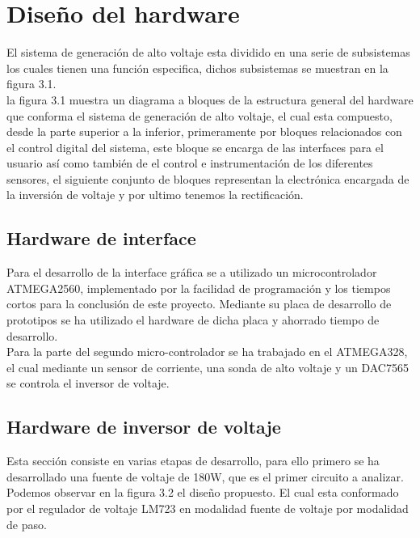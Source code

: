 \section{Diseño del hardware}
El sistema de generación de alto voltaje esta dividido en una serie de subsistemas los cuales tienen una función especifica, dichos subsistemas se muestran en la figura 3.1.\\

la figura 3.1 muestra un diagrama a bloques de la estructura general del hardware que conforma el sistema de generación de alto voltaje, el cual esta compuesto, desde la parte superior a la inferior, primeramente por bloques relacionados con el control digital del sistema, este bloque se encarga de las interfaces para el usuario así como también de el control e instrumentación de los diferentes sensores, el siguiente conjunto de bloques representan la electrónica encargada de la inversión de voltaje y por ultimo tenemos la rectificación.  \\

\subsection{Hardware de interface}
Para el desarrollo de la interface gráfica se a utilizado un microcontrolador ATMEGA2560, implementado por la facilidad de programación y los tiempos cortos para la conclusión de este proyecto. Mediante su placa de desarrollo de prototipos se ha utilizado el hardware de dicha placa y ahorrado tiempo de desarrollo. \\

Para la parte del segundo micro-controlador se ha trabajado en el ATMEGA328, el cual mediante un sensor de corriente, una sonda de alto voltaje y un DAC7565 se controla el inversor de voltaje. 

\subsection{Hardware de inversor de voltaje}

Esta sección consiste en varias etapas de desarrollo, para ello primero se ha desarrollado una fuente de voltaje de 180W, que es el primer circuito a analizar. Podemos observar en la figura 3.2 el diseño propuesto. El cual esta conformado por el regulador de voltaje LM723 en modalidad fuente de voltaje por modalidad de paso.

